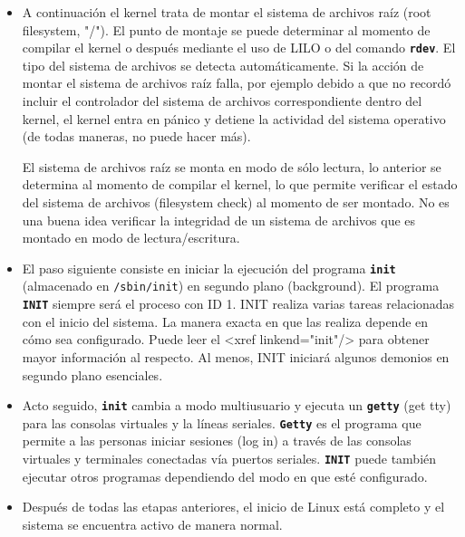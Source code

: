 \documentclass[12pt]{article}
\begin{document}
\begin{itemize}
	\item{
A continuación el kernel trata de montar el sistema de archivos raíz (root
filesystem, "/"). El punto de montaje se puede determinar al momento de compilar
el kernel o después mediante el uso de LILO o del comando
\texttt{\textbf{rdev}}. El tipo del sistema de archivos se detecta
automáticamente. Si la acción de montar el sistema de archivos raíz falla, por
ejemplo debido a que no recordó incluir el controlador del sistema de archivos
correspondiente dentro del kernel, el kernel entra en pánico y detiene la
actividad del sistema operativo (de todas maneras, no puede hacer más).  

 El sistema de archivos raíz se monta en modo de sólo lectura, lo anterior
se determina al momento de compilar el kernel, lo que permite verificar el
estado del sistema de archivos (filesystem check) al momento de ser montado. No
es una buena idea verificar la integridad de un sistema de archivos que es
montado en modo de lectura/escritura.  }

	\item{ El paso siguiente consiste en iniciar la  ejecución del
	programa \texttt{\textbf{init}} (almacenado en
	\texttt{/sbin/init}) en segundo plano (background). El
	programa \texttt{\textbf{INIT}} siempre será el proceso con ID 1. INIT
	realiza varias tareas relacionadas con el inicio del sistema. La manera
	exacta en que las realiza depende en cómo sea configurado. Puede leer el
	<xref linkend="init"/> para obtener mayor información al respecto. Al
	menos, INIT iniciará algunos demonios en segundo plano esenciales.
	}

	\item{ Acto seguido, \texttt{\textbf{init}} cambia a modo
	multiusuario y ejecuta un \texttt{\textbf{getty}} (get tty) para las
	consolas virtuales y la líneas seriales. \texttt{\textbf{Getty}} es el
	programa  que permite a las personas iniciar sesiones (log in) a través
	de las consolas virtuales y terminales conectadas vía puertos seriales.
	\texttt{\textbf{INIT}} puede también ejecutar otros programas
	dependiendo del modo en que esté configurado.  }

	\item{

Después de todas las etapas anteriores, el inicio de Linux está completo y el
sistema se encuentra activo de manera normal.  }

	\end{itemize} 
\end{document}
